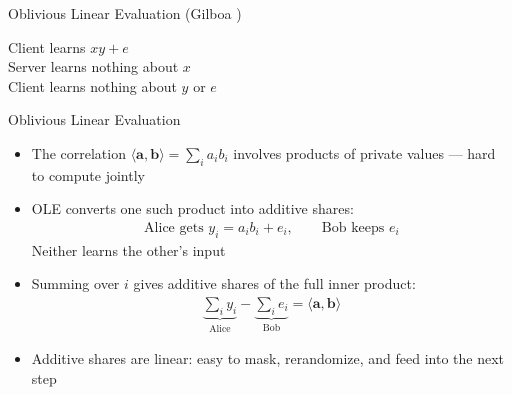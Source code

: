 \documentclass[10pt]{beamer}
\begin{document}
\begin{frame}{Oblivious Linear Evaluation (Gilboa \cite{C:Gilboa99})}

      \vspace{1em}
      \begin{block}{}
        \centering
        Client learns $xy + e$\\
        Server learns nothing about $x$\\
        Client learns nothing about $y$ or $e$
      \end{block}
\end{frame}


\begin{frame}{Oblivious Linear Evaluation}
  \begin{itemize}
    \item The correlation $\langle \mathbf{a}, \mathbf{b} \rangle = \sum_i a_i b_i$
      involves \alert{products of private values} --- hard to compute jointly
      \pause
    \item OLE converts one such product into \alert{additive shares}:
      \begin{align*}
        \text{Alice gets } y_i = a_i b_i + e_i, \qquad
        \text{Bob keeps } e_i
      \end{align*}
      Neither learns the other's input \pause
    \item Summing over $i$ gives additive shares of the full inner product:
      \begin{align*}
        \underbrace{\sum_i y_i}_{\text{Alice}} -
        \underbrace{\sum_i e_i}_{\text{Bob}}
        = \langle \mathbf{a}, \mathbf{b} \rangle
      \end{align*}
      \pause
    \item Additive shares are \alert{linear}: easy to mask, rerandomize,
      and feed into the next step
  \end{itemize}
\end{frame}
\end{document}
